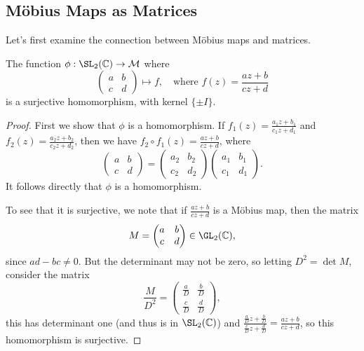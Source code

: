 \documentclass[a4paper]{scrartcl}
\begin{document}
\subsection{Möbius Maps as Matrices}

Let's first examine the connection between Möbius maps and matrices.

\begin{proposition}
	The function $\phi : \SL_2(\mathbb{C}) \rightarrow \mathcal{M}$ where 
	$$
		\begin{pmatrix}
			a & b \\ c & d
		\end{pmatrix} \longmapsto f, \quad \text{where } f(z) = \frac{az + b}{cz + d} 
	$$
	is a surjective homomorphism, with kernel $\{\pm I\}$.
\end{proposition}
\begin{proof}
	First we show that $\phi$ is a homomorphism. If $f_1(z) = \frac{a_1 z + b_1}{c_1 z + d_1}$ and $f_2(z) = \frac{a_2 z + b_2}{c_2 z + d_2}$, then we have $f_2 \circ f_1(z) = \frac{az + b}{cz + d}$, where
	$$
	\begin{pmatrix}
		a & b \\
		c & d
		\end{pmatrix}=\begin{pmatrix}
		a_{2} & b_{2} \\
		c_2 & d_{2}
		\end{pmatrix}\begin{pmatrix}
		a_{1} & b_{1} \\
		c_{1} & d_{1}
		\end{pmatrix}.
	$$
	It follows directly that $\phi$ is a homomorphism.

	To see that it is surjective, we note that if $\frac{az + b}{cz + d}$ is a Möbius map, then the matrix
	$$
	M = \begin{pmatrix}
		a & b \\
		c & d
		\end{pmatrix} \in \GL_2(\mathbb{C}),
	$$
	since $ad - bc \neq 0$. But the determinant may not be zero, so letting $D^2= \det M$, consider the matrix
	$$
	\frac{M}{D^2} = \begin{pmatrix}
		\frac{a}{D} & \frac{b}{D} \\
		\frac{c}{D} & \frac{d}{D}
		\end{pmatrix},
	$$
	this has determinant one (and thus is in $\SL_2(\mathbb{C})$) and $\frac{\frac{a}{D}z + \frac{b}{D}}{\frac{c}{D}z + \frac{d}{D}} = \frac{az + b}{cz + d}$, so this homomorphism is surjective.


\end{proof}
\end{document}
